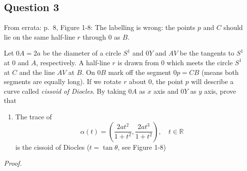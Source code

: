 \documentclass[12pt]{article}
\begin{document}
\subsection*{Question 3}

From errata: p.~8, Figure 1-8: The labelling is wrong: the points \(p\)
and \(C\) should lie on the same half-line \(r\) through \(0\) as \(B\).

Let \(0A = 2a\) be the diameter of a circle \(S^1\) and \(0Y\) and
\(AV\) be the tangents to \(S^1\) at \(0\) and \(A\), respectively. A
half-line \(r\) is drawn from \(0\) which meets the circle \(S^1\) at
\(C\) and the line \(AV\) at \(B\). On \(0B\) mark off the segment
\(0p = CB\) (means both segments are equally long). If we rotate \(r\)
about \(0\), the point \(p\) will describe a curve called \emph{cissoid
of Diocles}. By taking \(0A\) as \(x\) axis and \(0Y\) as \(y\) axis,
prove that

\begin{enumerate}
\def\labelenumi{\alph{enumi}.}
\item
  The trace of
  \[ \alpha(t) = \left( \frac{2at^2}{1+t^2}, \frac{2at^3}{1+t^2} \right) ,\quad t\in\mathbb{R} \]
  is the cissoid of Diocles (\(t = \tan\theta\), see Figure 1-8)
\end{enumerate}

\emph{Proof.}
\end{document}

